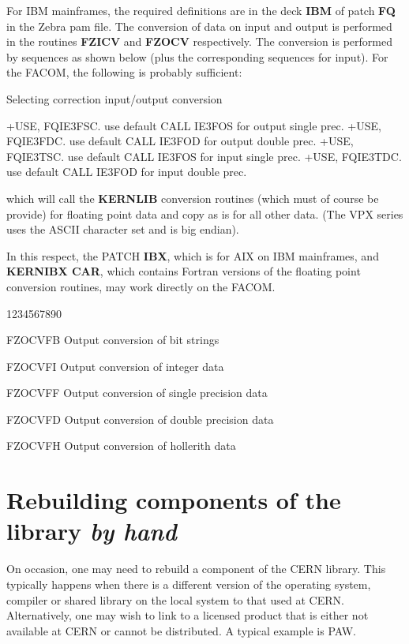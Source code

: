 For IBM mainframes, the required definitions are in
the deck {\bf IBM} of patch {\bf FQ} in the Zebra pam file.
The conversion of data on input and output is performed
in the routines {\bf FZICV} and {\bf FZOCV} respectively.
The conversion is performed by sequences as shown below
(plus the corresponding sequences for input). For the FACOM,
the following is probably sufficient:

\begin{XMPt}{Selecting correction input/output conversion}

+USE, FQIE3FSC.    use default CALL IE3FOS for output single prec.
+USE, FQIE3FDC.    use default CALL IE3FOD for output double prec.
+USE, FQIE3TSC.    use default CALL IE3FOS for input single prec.
+USE, FQIE3TDC.    use default CALL IE3FOD for input double prec.

\end{XMPt}

which will call the {\bf KERNLIB} conversion routines (which must
of course be provide) for floating point data and copy as is
for all other data. (The VPX series uses the ASCII character
set and is big endian).

In this respect, the PATCH {\bf IBX}, which is for AIX on
IBM mainframes, and {\bf KERNIBX CAR}, which contains
Fortran versions of the floating point conversion routines,
may work directly on the FACOM.

\begin{DLtt}{1234567890}
\item[FZOCVFB]Output conversion of bit strings
\item[FZOCVFI]Output conversion of integer data
\item[FZOCVFF]Output conversion of single precision data
\item[FZOCVFD]Output conversion of double precision data
\item[FZOCVFH]Output conversion of hollerith data
\end{DLtt}
\chapter{Rebuilding components of the library {\it by hand}}

On occasion, one may need to rebuild a component of the CERN
library. This typically happens when there is a different
version of the operating system, compiler or shared library
on the local system to that used at CERN. Alternatively, 
one may wish to link to a licensed product that is either
not available at CERN or cannot be distributed. A typical
example is PAW.

